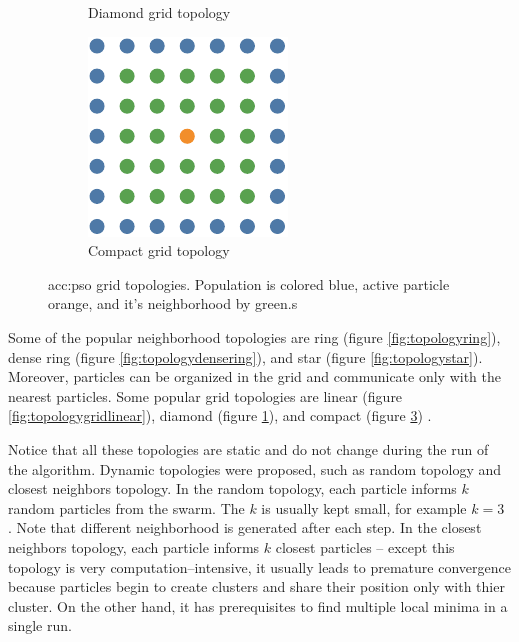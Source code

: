 \begin{figure}[t]
\begin{subfigure}[t]{0.3\textwidth}
        \caption{Diamond grid topology}
        \label{fig:topologygriddiamond}
    \end{subfigure}
    \hfill
    \begin{subfigure}[t]{0.3\textwidth}
        \includegraphics[width=\textwidth]{img/master_neigh_compact.pdf}
        \caption{Compact grid topology}
        \label{fig:topologygridcompact}
    \end{subfigure}
    \caption[\acrshort*{acc:pso} grid topologies]{\acrshort*{acc:pso} grid topologies. Population is colored blue, active particle orange, and it's neighborhood by green.s}
\end{figure}

Some of the popular neighborhood topologies are ring (figure \ref{fig:topologyring}), dense ring (figure \ref{fig:topologydensering}), and star (figure \ref{fig:topologystar}). Moreover, particles can be organized in the grid and communicate only with the nearest particles. Some popular grid topologies are linear (figure \ref{fig:topologygridlinear}), diamond (figure \ref{fig:topologygriddiamond}), and compact (figure \ref{fig:topologygridcompact}) \citep{PSOtopologies}.

Notice that all these topologies are static and do not change during the run of the algorithm. Dynamic topologies were proposed, such as random topology and closest neighbors topology. In the random topology, each particle informs $k$ random particles from the swarm. The $k$ is usually kept small, for example $k=3$ \citep{SPSObenchmark}. Note that different neighborhood is generated after each step. In the closest neighbors topology, each particle informs $k$ closest particles -- except this topology is very computation--intensive, it usually leads to premature convergence because particles begin to create clusters and share their position only with thier cluster. On the other hand, it has prerequisites to find multiple local minima in a single run.

